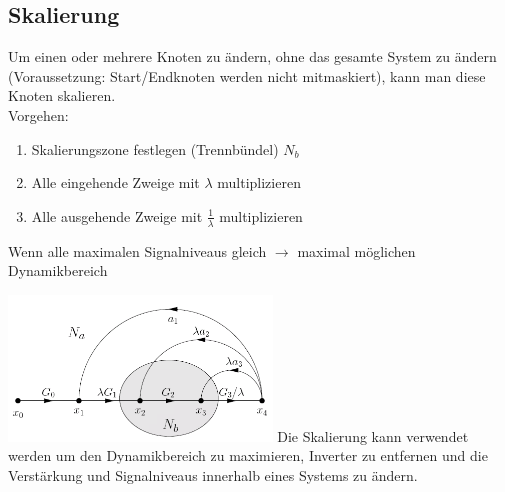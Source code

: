 \subsection{Skalierung }
	\vspace*{-1cm}
	\begin{minipage}[]{10cm}
		Um einen oder mehrere Knoten zu ändern, ohne das gesamte System zu
		ändern (Voraussetzung: Start/Endknoten werden nicht mitmaskiert), kann man
		diese Knoten skalieren.\\
		Vorgehen: 
		\begin{enumerate}
                \item Skalierungszone festlegen (Trennbündel) $N_b$
                \item Alle eingehende Zweige mit $\lambda$ multiplizieren
                \item Alle ausgehende Zweige mit $\frac{1}{\lambda}$
                multiplizieren
	    \end{enumerate}
	    Wenn alle maximalen Signalniveaus gleich $\rightarrow$ maximal möglichen
	    Dynamikbereich\\
	\end{minipage}
	\hspace*{1cm}
    \begin{minipage}[t]{7cm}
      \includegraphics[width=7cm]{./bilder/sfd-scalierung.png}
       Die Skalierung kann verwendet werden um den Dynamikbereich zu maximieren, Inverter zu entfernen
       und die Verstärkung und Signalniveaus innerhalb eines Systems zu ändern.
    \end{minipage}

    

